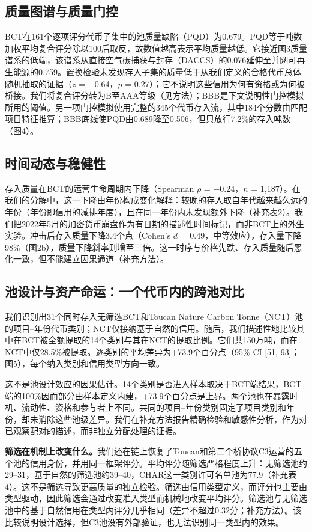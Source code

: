 \documentclass[12pt,a4paper]{article}
\begin{document}
\subsection*{质量图谱与质量门控}

BCT在161个逐项评分代币子集中的池质量缺陷（PQD）为0.679。PQD等于吨数加权平均复合评分除以100后取反，故数值越高表示平均质量越低。它接近图3质量谱系的低端，该谱系从直接空气碳捕获与封存（DACCS）的0.076延伸至并网可再生能源的0.759。置换检验未发现存入子集的质量低于从我们定义的合格代币总体随机抽取的证据（$z$ = $-$0.64，$p$ = 0.27）；它不说明这些信用为何有资格或为何被桥接。我们将复合评分转为B至AAA等级（见方法）；BBB是下文说明性门控模拟所用的阈值。另一项门控模拟使用完整的345个代币存入流，其中184个分数由匹配项目特征推算；BBB底线使PQD由0.689降至0.506，但只放行7.2\%的存入吨数（图4）。


\subsection*{时间动态与稳健性}

存入质量在BCT的运营生命周期内下降（Spearman $\rho$ = $-$0.24，$n$ = 1,187）。在我们的分解中，这一下降由年份构成变化解释：较晚的存入取自年代越来越久远的年份（年份即信用的减排年度），且在同一年份内未发现额外下降（补充表2）。我们把2022年5月的加密货币崩盘作为有日期的描述性时间标记，而非BCT上的外生实验。冲击后存入质量下降3.4个点（Cohen's $d$ = 0.49，中等效应），存入量下降98\%（图2b），质量下降斜率则增至三倍。这一时序与价格先跌、存入质量随后恶化一致，但不能建立因果通道（补充方法）。

\subsection*{池设计与资产命运：一个代币内的跨池对比}

我们识别出31个同时存入无筛选BCT和Toucan Nature Carbon Tonne（NCT）池的项目--年份代币类别；NCT仅接纳基于自然的信用。随后，我们描述性地比较其中在BCT被全额提取的14个类别与其在NCT的提取比例。它们共150万吨，而在NCT中仅28.5\%被提取。逐类别的平均差异为+73.9个百分点（95\% CI [51, 93]；图5），每个纳入类别和信用类型方向一致。

这不是池设计效应的因果估计。14个类别是否进入样本取决于BCT端结果，BCT端的100\%因而部分由样本定义内建，+73.9个百分点是上界。两个池也在暴露时机、流动性、资格和参与者上不同。共同的项目--年份类别固定了项目类别和年份，却未消除这些池级差异。我们在补充方法报告精确检验和敏感性分析，作为对已观察配对的描述，而非独立分配处理的证据。

\textbf{筛选在机制上改变什么。}我们还在链上恢复了Toucan和第二个桥协议C3运营的五个池的信用身份，并用同一框架评分。平均评分随筛选严格程度上升：无筛选池约29--31，基于自然的筛选池约39--40，CHAR这一类别许可名单池为77.9（补充表4）。这不是筛选导致更高质量的独立检验。筛选由信用类型定义，而评分也主要由类型驱动，因此筛选会通过改变准入类型而机械地改变平均评分。筛选池与无筛选池中的基于自然信用在类型内评分几乎相同（差异不超过0.32分；补充方法）。该比较说明设计选择，但C3池没有外部验证，也无法识别同一类型内的效果。
\end{document}
